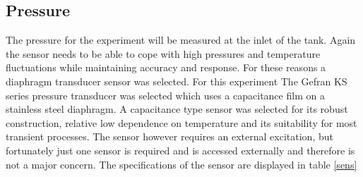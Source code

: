 \documentclass[paper=a4, fontsize=11pt, abstract=on]{scrartcl}
\numberwithin{equation}{section}		%
\numberwithin{figure}{section}			%
\numberwithin{table}{section}				%
\begin{document}
\subsection{Pressure}
The pressure for the experiment will be measured at the inlet of the tank. Again the sensor needs to  be able to cope with high pressures and temperature fluctuations while maintaining accuracy and response. For these reasons a diaphragm transducer sensor was selected. For this experiment The Gefran KS series pressure transducer was selected which uses a capacitance film on a stainless steel diaphragm. A capacitance type sensor was selected for its robust construction, relative low dependence on temperature and its suitability for most transient processes. The sensor however requires an external excitation, but fortunately just one sensor is required and is accessed externally and therefore is not a major concern. The specifications of the sensor are displayed in table \ref{sens}
\end{document}
